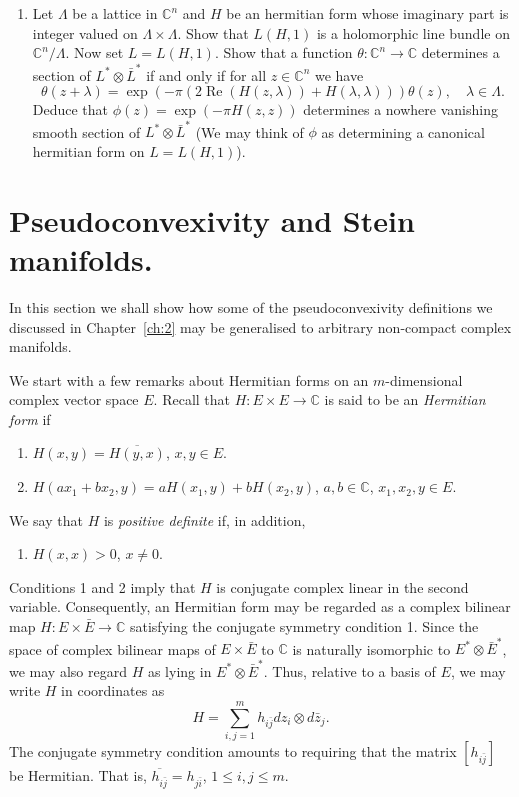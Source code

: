 \begin{enumerate}
\item Let $\Lambda$ be a lattice in $\mathbb C^n$ and $H$ be an hermitian form whose imaginary part is integer valued on $\Lambda\times\Lambda$. Show that $L(H,1)$ is a holomorphic line bundle on $\mathbb C^n/\Lambda$. Now set $L=L(H,1)$. Show that a function $\theta:\mathbb C^n\to\mathbb C$ determines a section of $L^*\otimes\bar L^*$ if and only if for all $z\in\mathbb C^n$ we have
\[\theta(z+\lambda)=\exp(-\pi(2\operatorname{Re}(H(z,\lambda))+H(\lambda,\lambda)))\theta(z),\quad\lambda\in\Lambda.\]
Deduce that $\phi(z)=\exp(-\pi H(z,z))$ determines a nowhere vanishing smooth section of $L^*\otimes\bar L^*$ (We may think of $\phi$ as determining a canonical hermitian form on $L=L(H,1)$).
\end{enumerate}
\section{Pseudoconvexivity and Stein manifolds.}\label{sec:5:10}
In this section we shall show how some of the pseudoconvexivity definitions we discussed in Chapter~\ref{ch:2} may be generalised to arbitrary non-compact complex manifolds.

We start with a few remarks about Hermitian forms on an $m$-dimensional complex vector space $E$. Recall that $H:E\times E\to\mathbb C$ is said to be an \emph{Hermitian form} if
\begin{enumerate}
\item $H(x,y)=\overline{H(y,x)}$, $x,y\in E$.
\item $H(ax_1+bx_2,y)=aH(x_1,y)+bH(x_2,y)$, $a,b\in\mathbb C$, $x_1,x_2,y\in E$.
\end{enumerate}
We say that $H$ is \emph{positive definite} if, in addition,
\begin{enumerate}[start=3]
\item $H(x,x)>0$, $x\neq0$.
\end{enumerate}
Conditions 1 and 2 imply that $H$ is conjugate complex linear in the second variable. Consequently, an Hermitian form may be regarded as a complex bilinear map $H:E\times\bar E\to\mathbb C$ satisfying the conjugate symmetry condition 1. Since the space of complex bilinear maps of $E\times\bar E$ to $\mathbb C$ is naturally isomorphic to $E^*\otimes\bar E^*$, we may also regard $H$ as lying in $E^*\otimes\bar E^*$. Thus, relative to a basis of $E$, we may write $H$ in coordinates as
\[H=\sum_{i,j=1}^mh_{i\bar j}dz_i\otimes d\bar z_j.\]
The conjugate symmetry condition amounts to requiring that the matrix $[h_{i\bar j}]$ be Hermitian. That is, $\overline{h_{i\bar j}}=h_{j\bar i}$, $1\leq i,j\leq m$.

